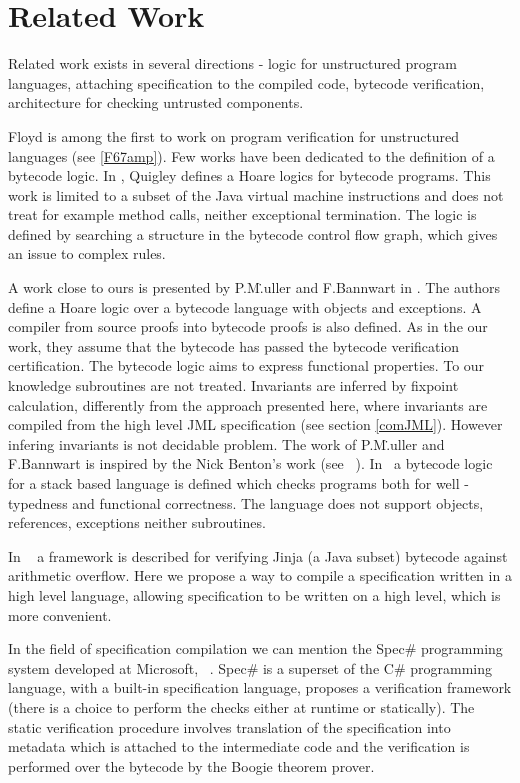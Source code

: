 \section{Related Work} \label{relWork}
    
Related work exists in several directions -  logic for unstructured program languages,  attaching specification to the compiled code, bytecode verification, architecture for
checking untrusted components.

Floyd is among the first to work on program verification for unstructured languages (see \ref{F67amp}).
Few works have been dedicated to the definition of a bytecode logic. In \cite{Quigley}, Quigley defines a Hoare logics for bytecode programs. 
 This work is limited to a subset of the Java virtual machine instructions and does not treat for example method calls, 
 neither exceptional termination. The logic is defined by searching a structure in the bytecode control flow graph, 
 which gives an issue to complex rules.

A work close to ours is presented by P.M\..uller and F.Bannwart in \cite{BM05plb}. The authors define a Hoare logic over a 
bytecode language with objects and  exceptions. A compiler from source proofs into bytecode proofs is also defined. 
As in the our work, they assume that the bytecode has passed the bytecode verification certification. The bytecode logic aims to 
express functional properties. To our knowledge subroutines are not treated. Invariants are inferred by fixpoint calculation, differently 
from the approach presented here, where invariants are compiled from the high level JML specification (see section \ref{comJML}). 
However infering invariants is not decidable problem. The work of P.M\..uller and F.Bannwart is inspired by the Nick Benton's work (see ~\cite{B04tlsj}). 
In~\cite{B04tlsj} a bytecode logic for a stack based language is defined which checks programs both for well - typedness and functional correctness. 
 The language does not support objects, references, exceptions neither subroutines. 

In ~\cite{WildmoserN-ESOP05} a  framework is described for verifying Jinja (a Java subset) bytecode against arithmetic overflow. 
Here we propose a way to compile a specification written in a high level language, allowing specification to be written on a 
high level, which is more convenient.

In the field of specification compilation we can mention the Spec\# programming system developed at Microsoft,
~\cite{BLS04sp}. Spec\#  is a superset of the C\# programming language, with a built-in  specification language,
 proposes a verification framework (there is a choice to perform the checks either at runtime or statically). 
 The static verification procedure  involves translation of the specification into metadata which is attached to the intermediate code 
 and the verification is performed over the bytecode by the Boogie theorem prover.

